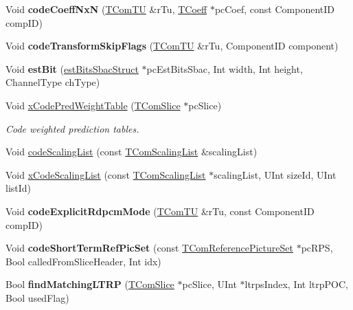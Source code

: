 \begin{DoxyCompactItemize}
\item 
\mbox{\label{class_t_enc_cavlc_afc31f8ade2e8cb56e3e07f7d714845ac}} 
Void {\bfseries code\+Coeff\+NxN} (\hyperlink{class_t_com_t_u}{T\+Com\+TU} \&r\+Tu, \hyperlink{_type_def_8h_a5bdd3b17d14ed1978c366d2d958c0300}{T\+Coeff} $\ast$pc\+Coef, const Component\+ID comp\+ID)
\item 
\mbox{\label{class_t_enc_cavlc_a1851c104c360f95f4ce8c663d3af4107}} 
Void {\bfseries code\+Transform\+Skip\+Flags} (\hyperlink{class_t_com_t_u}{T\+Com\+TU} \&r\+Tu, Component\+ID component)
\item 
\mbox{\label{class_t_enc_cavlc_a9332f9cfa466d0b00549c408eea5e67c}} 
Void {\bfseries est\+Bit} (\hyperlink{structest_bits_sbac_struct}{est\+Bits\+Sbac\+Struct} $\ast$pc\+Est\+Bits\+Sbac, Int width, Int height, Channel\+Type ch\+Type)
\item 
\mbox{\label{class_t_enc_cavlc_a04fba7cb6d70fa5bb78c969f009aef23}} 
Void \hyperlink{class_t_enc_cavlc_a04fba7cb6d70fa5bb78c969f009aef23}{x\+Code\+Pred\+Weight\+Table} (\hyperlink{class_t_com_slice}{T\+Com\+Slice} $\ast$pc\+Slice)
\begin{DoxyCompactList}\small\item\em Code weighted prediction tables. \end{DoxyCompactList}\item 
Void \hyperlink{class_t_enc_cavlc_a72309819d1c1849899f93a0af93f9706}{code\+Scaling\+List} (const \hyperlink{class_t_com_scaling_list}{T\+Com\+Scaling\+List} \&scaling\+List)
\item 
Void \hyperlink{class_t_enc_cavlc_a8481a42fc17da67550d0c8d7c3b20888}{x\+Code\+Scaling\+List} (const \hyperlink{class_t_com_scaling_list}{T\+Com\+Scaling\+List} $\ast$scaling\+List, U\+Int size\+Id, U\+Int list\+Id)
\item 
\mbox{\label{class_t_enc_cavlc_a460a3f282f96477024f4f0e37aa5713b}} 
Void {\bfseries code\+Explicit\+Rdpcm\+Mode} (\hyperlink{class_t_com_t_u}{T\+Com\+TU} \&r\+Tu, const Component\+ID comp\+ID)
\item 
\mbox{\label{class_t_enc_cavlc_a18a9443c727d3ceeed27782a5b611036}} 
Void {\bfseries code\+Short\+Term\+Ref\+Pic\+Set} (const \hyperlink{class_t_com_reference_picture_set}{T\+Com\+Reference\+Picture\+Set} $\ast$pc\+R\+PS, Bool called\+From\+Slice\+Header, Int idx)
\item 
\mbox{\label{class_t_enc_cavlc_ae780eeaae1cd9e6a2e7bd175b46ff7e3}} 
Bool {\bfseries find\+Matching\+L\+T\+RP} (\hyperlink{class_t_com_slice}{T\+Com\+Slice} $\ast$pc\+Slice, U\+Int $\ast$ltrps\+Index, Int ltrp\+P\+OC, Bool used\+Flag)
\end{DoxyCompactItemize}
